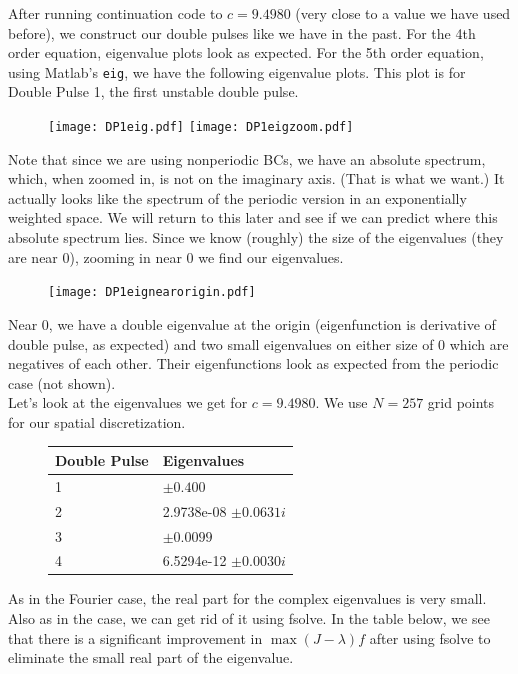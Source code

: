 \documentclass[12pt]{article}
\begin{document}
After running continuation code to $c = 9.4980$ (very close to a value we have used before), we construct our double pulses like we have in the past. For the 4th order equation, eigenvalue plots look as expected. For the 5th order equation, using Matlab's \texttt{eig}, we have the following eigenvalue plots. This plot is for Double Pulse 1, the first unstable double pulse. 

\begin{figure}[H]
	\texttt{[image: DP1eig.pdf]}
	\texttt{[image: DP1eigzoom.pdf]}
\end{figure}

Note that since we are using nonperiodic BCs, we have an absolute spectrum, which, when zoomed in, is not on the imaginary axis. (That is what we want.) It actually looks like the spectrum of the periodic version in an exponentially weighted space. We will return to this later and see if we can predict where this absolute spectrum lies. Since we know (roughly) the size of the eigenvalues (they are near 0), zooming in near 0 we find our eigenvalues.

\begin{figure}[H]
	\texttt{[image: DP1eignearorigin.pdf]}
\end{figure}
Near 0, we have a double eigenvalue at the origin (eigenfunction is derivative of double pulse, as expected) and two small eigenvalues on either size of 0 which are negatives of each other. Their eigenfunctions look as expected from the periodic case (not shown).\\

Let's look at the eigenvalues we get for $c = 9.4980$. We use $N = 257$ grid points for our spatial discretization.

\begin{figure}[H]
\begin{tabular}{l|l}
Double Pulse   & Eigenvalues      \\ \hline
  1  &  $\pm 0.400$               \\ 
  2  &  2.9738e-08 $\pm 0.0631i$  \\ 
  3  & $\pm 0.0099$               \\
  4  & 6.5294e-12 $\pm 0.0030i$   \\
\end{tabular}
\end{figure}

As in the Fourier case, the real part for the complex eigenvalues is very small. Also as in the case, we can get rid of it using fsolve. In the table below, we see that there is a significant improvement in $\max (J -\lambda )f $ after using fsolve to eliminate the small real part of the eigenvalue. 
\end{document}
